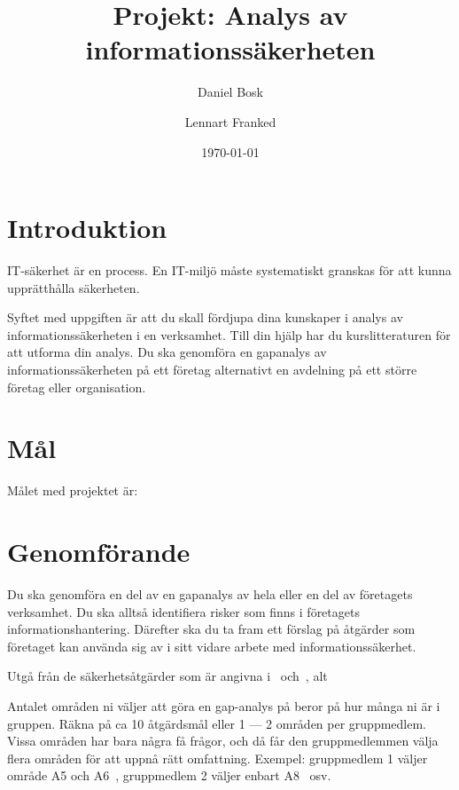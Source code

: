 \documentclass[a4paper]{article}
\begin{document}
\title{Projekt: Analys av informationssäkerheten}
\author{Daniel Bosk}
\author{Lennart Franked}
\date{\today}

\maketitle

\section{Introduktion}

IT-säkerhet är en process.
En IT-miljö måste systematiskt granskas för att kunna upprätthålla säkerheten.

Syftet med uppgiften är att du skall fördjupa dina kunskaper i analys av 
informationssäkerheten i en verksamhet.
Till din hjälp har du kurslitteraturen för att utforma din analys.
Du ska genomföra en gapanalys av informationssäkerheten på ett företag 
alternativt en avdelning på ett större företag eller organisation.


\section{Mål}

Målet med projektet är:
\begin{itemize}
	
\end{itemize}


\section{Genomförande}
\noindent
Du ska genomföra en del av en gapanalys av hela eller en del av företagets 
verksamhet.
Du ska alltså identifiera risker som finns i företagets informationshantering.
Därefter ska du ta fram ett förslag på åtgärder som företaget kan använda sig 
av i sitt vidare arbete med informationssäkerhet.

Utgå från de säkerhetsåtgärder som är angivna i~\cite[Bilaga A]{iso27001} 
och~\cite[Bilaga A]{iso27701}, alt~\cite[VERKTYG-ANALYS-GAP.XLSX]{MSB2018anv} 

Antalet områden ni väljer att göra en gap-analys på beror på hur många ni är i gruppen. Räkna på ca
10 åtgärdsmål eller 1 --- 2 områden per gruppmedlem. Vissa områden har bara några få frågor, och då
får den gruppmedlemmen välja flera områden för att uppnå rätt omfattning. Exempel: gruppmedlem 1
väljer område A5 och A6~\cite[Bilaga A]{iso27001}, gruppmedlem 2 väljer enbart A8~\cite[Bilaga
A]{iso27001} osv.
\end{document}
